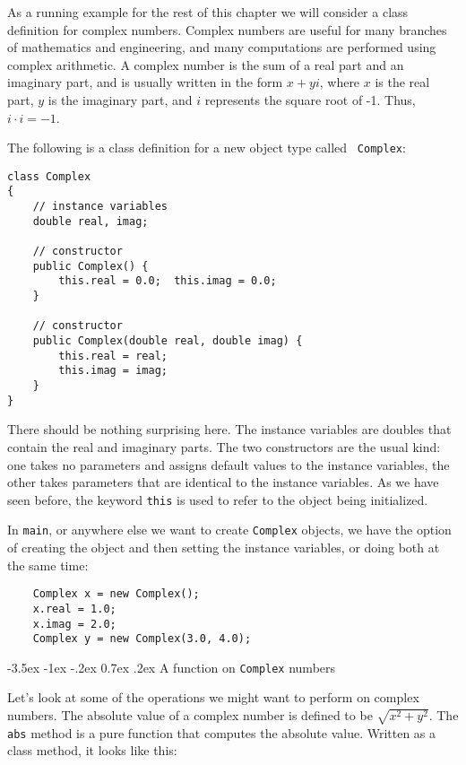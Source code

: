 \documentclass{book}
\makeatletter
\renewcommand{\section}{\@startsection 
    {section} {1} {0mm}%
    {-3.5ex \@plus -1ex \@minus -.2ex}%
    {0.7ex \@plus.2ex}%
    {\normalfont\Large\bfseries}}
\makeatother
\begin{document}
As a running example for the rest of this chapter we will consider a
class definition for complex numbers.  Complex numbers are useful for
many branches of mathematics and engineering, and many computations
are performed using complex arithmetic.  A complex number is the sum
of a real part and an imaginary part, and is usually written in the
form $x + yi$, where $x$ is the real part, $y$ is the imaginary part,
and $i$ represents the square root of -1.
Thus, $i \cdot i = -1$.

The following is a class definition for a new object type called {\tt
Complex}:

\begin{verbatim}
class Complex
{
    // instance variables
    double real, imag;

    // constructor
    public Complex() {
        this.real = 0.0;  this.imag = 0.0;
    }
	
    // constructor
    public Complex(double real, double imag) {
        this.real = real;  
        this.imag = imag;
    }
}
\end{verbatim}
%
There should be nothing surprising here.  The instance variables
are doubles that contain the real and imaginary parts.
The two constructors are the usual kind: one takes no parameters
and assigns default values to the instance variables, the other
takes parameters that are identical to the instance variables.
As we have seen before, the keyword {\tt this} is used to refer
to the object being initialized.


In {\tt main}, or anywhere else we want to create {\tt Complex}
objects, we have the option of creating the object and then
setting the instance variables, or doing both at the same time:

\begin{verbatim}
    Complex x = new Complex();
    x.real = 1.0;
    x.imag = 2.0;
    Complex y = new Complex(3.0, 4.0);
\end{verbatim}


\section{A function on {\tt Complex} numbers}

Let's look at some of the operations we might want to perform
on complex numbers.  The absolute value of a complex number is
defined to be $\sqrt {x^2 + y^2}$.  The {\tt abs} method is
a pure function that computes the absolute value.  Written as
a class method, it looks like this:
\end{document}
